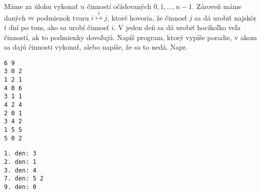\begin{uloha}
Máme za úlohu vykonať $n$ činností očíslovaných $0,1,\ldots,n-1$. Zároveň máme daných
  $m$ podmienok tvaru $i\overset{t}{\mapsto} j$, ktoré hovoria, že činnosť $j$
  sa dá urobiť najskôr $t$ dní po tom, ako sa urobí činnosť $i$. V jeden deň 
  sa dá urobiť hocikoľko veľa činností, ak to podmienky dovoľujú.
  Napíš program, ktorý vypíše poradie,
  v akom sa dajú činnosti vykonať, alebo napíše, že sa to nedá. Napr.


\def\nd(#1)#2{\filldraw[thick, fill=yellow!10!white] (#1) node {\vb{#2}} circle (2ex);}
\def\lnks(#1,#2)#3{\draw [->, shorten >= 2.4ex] (n#1) --  node[anchor=south]{\vb{\small #3}} (n#2);}
\def\lnk(#1,#2)#3#4{\draw [->, shorten >= 2.4ex] (n#1) to[out=#3,in=180-#3] node[anchor=south]{\vb{\small #4}} (n#2);}
\def\lnkf(#1,#2)[#3,#4]#5{\draw [->, shorten >= 2.4ex] (n#1) to[out=#3,in=#4] node[anchor=south]{\vb{\small #5}} (n#2);}

\begin{minipage}[t]{0.2\textwidth}\vspace{0pt}
\begin{Verbatim}
6 9
3 0 2
1 2 1
4 0 6
3 1 1
4 2 4
2 0 1
3 4 2
1 5 5
5 0 2
\end{Verbatim}
\end{minipage}
  \begin{minipage}[t]{0.5\textwidth}\vspace{0pt}
  \end{minipage}
  \begin{minipage}[t]{0.3\textwidth}\vspace{0pt}
\begin{Verbatim}
1. den: 3
2. den: 1
3. den: 4
7. den: 5 2
9. den: 0
\end{Verbatim}
\end{minipage}


\end{uloha}

